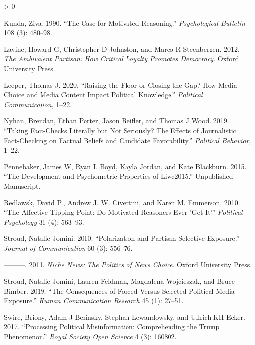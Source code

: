\documentclass[
  12pt,
]{article}
\newlength{\cslhangindent}
\newenvironment{CSLReferences}[2] %
 {%
  \setlength{\parindent}{0pt}
  \ifodd #1 \everypar{\setlength{\hangindent}{\cslhangindent}}\ignorespaces\fi
  \ifnum #2 > 0
  \setlength{\parskip}{#2\baselineskip}
  \fi
 }%
 {}
\begin{document}
\begin{CSLReferences}{1}{0}
\leavevmode\hypertarget{ref-kunda1990case}{}%
Kunda, Ziva. 1990. {``The Case for Motivated Reasoning.''}
\emph{Psychological Bulletin} 108 (3): 480--98.

\leavevmode\hypertarget{ref-lavine2012ambivalent}{}%
Lavine, Howard G, Christopher D Johnston, and Marco R Steenbergen. 2012.
\emph{The Ambivalent Partisan: How Critical Loyalty Promotes Democracy}.
Oxford University Press.

\leavevmode\hypertarget{ref-leeper2020raising}{}%
Leeper, Thomas J. 2020. {``Raising the Floor or Closing the Gap? How
Media Choice and Media Content Impact Political Knowledge.''}
\emph{Political Communication}, 1--22.

\leavevmode\hypertarget{ref-nyhan2019taking}{}%
Nyhan, Brendan, Ethan Porter, Jason Reifler, and Thomas J Wood. 2019.
{``Taking Fact-Checks Literally but Not Seriously? The Effects of
Journalistic Fact-Checking on Factual Beliefs and Candidate
Favorability.''} \emph{Political Behavior}, 1--22.

\leavevmode\hypertarget{ref-pennebaker2015development}{}%
Pennebaker, James W, Ryan L Boyd, Kayla Jordan, and Kate Blackburn.
2015. {``The Development and Psychometric Properties of Liwc2015.''}
Unpublished Manuscript.

\leavevmode\hypertarget{ref-redlawsk2010affective}{}%
Redlawsk, David P., Andrew J. W. Civettini, and Karen M. Emmerson. 2010.
{``The Affective Tipping Point: Do Motivated Reasoners Ever 'Get It'.''}
\emph{Political Psychology} 31 (4): 563--93.

\leavevmode\hypertarget{ref-stroud2010polarization}{}%
Stroud, Natalie Jomini. 2010. {``Polarization and Partisan Selective
Exposure.''} \emph{Journal of Communication} 60 (3): 556--76.

\leavevmode\hypertarget{ref-stroud2011niche}{}%
---------. 2011. \emph{Niche News: The Politics of News Choice}. Oxford
University Press.

\leavevmode\hypertarget{ref-stroud2019consequences}{}%
Stroud, Natalie Jomini, Lauren Feldman, Magdalena Wojcieszak, and Bruce
Bimber. 2019. {``The Consequences of Forced Versus Selected Political
Media Exposure.''} \emph{Human Communication Research} 45 (1): 27--51.

\leavevmode\hypertarget{ref-swire2017processing}{}%
Swire, Briony, Adam J Berinsky, Stephan Lewandowsky, and Ullrich KH
Ecker. 2017. {``Processing Political Misinformation: Comprehending the
Trump Phenomenon.''} \emph{Royal Society Open Science} 4 (3): 160802.


\end{CSLReferences}
\end{document}

